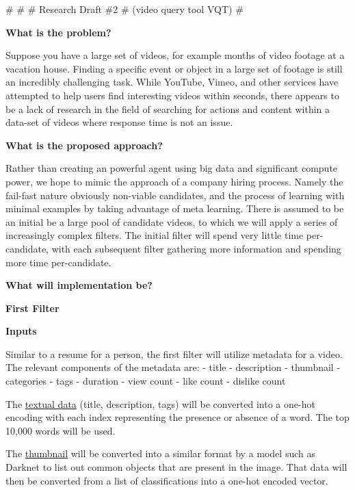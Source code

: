 \documentclass{article}
\newcommand{\br}{ \hfill \break}
\begin{document}
%
%
%
\# \br
\# \br 
\# Research Draft \#2 \br
\# (video query tool VQT) \br 
\# \br
\date{March 2020} \br
\begin{adjustwidth}{2.5em}{0pt}




\textbf{What is the problem?}\br \begin{adjustwidth}{2.5em}{0pt}
Suppose you have a large set of videos, for example months of video footage at a vacation house. Finding a specific event or object in a large set of footage is still an incredibly challenging task. While YouTube, Vimeo, and other services have attempted to help users find interesting videos within seconds, there appears to be a lack of research in the field of searching for actions and content within a data-set of videos where response time is not an issue.
\end{adjustwidth} \br 

\textbf{What is the proposed approach?}\br \begin{adjustwidth}{2.5em}{0pt}
Rather than creating an powerful agent using big data and significant compute power, we hope to mimic the approach of a company hiring process. Namely the fail-fast nature obviously non-viable candidates, and the process of learning with minimal examples by taking advantage of meta learning. There is assumed to be an initial be a large pool of candidate videos, to which we will apply a series of increasingly complex filters. The initial filter will spend very little time per-candidate, with each subsequent filter gathering more information and spending more time per-candidate.
\end{adjustwidth} \br 


\textbf{What will implementation be?}\br

\textbf{First Filter}\br \begin{adjustwidth}{2.5em}{0pt}

\textbf{Inputs}

Similar to a resume for a person, the first filter will utilize metadata for a video. The relevant components of the metadata are: \br
- title \br
- description \br
- thumbnail \br
- categories \br
- tags \br
- duration \br
- view count \br
- like count \br
- dislike count \br

The \underline{textual data} (title, description, tags) will be converted into a one-hot encoding with each index representing the presence or absence of a word. The top 10,000 words will be used. \br

The \underline{thumbnail} will be converted into a similar format by a model such as Darknet to list out common objects that are present in the image. That data will then be converted from a list of classifications into a one-hot encoded vector. \br


\end{adjustwidth}
\end{adjustwidth}
\end{document}

